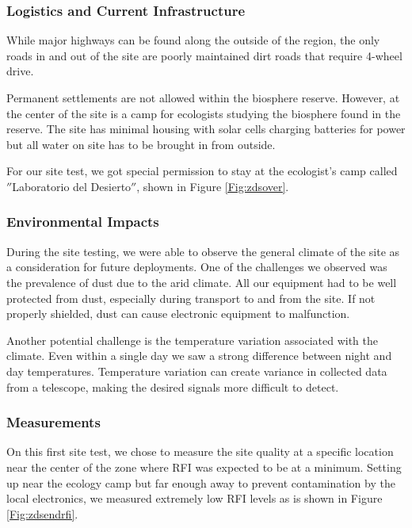 \subsubsection{Logistics and Current Infrastructure}

While major highways can be found along the outside of the region, the only roads in and out of the site are poorly maintained dirt roads that require 4-wheel drive.

Permanent settlements are not allowed within the biosphere reserve. However, at the center of the site is a camp for ecologists studying the biosphere found in the reserve. The site has minimal housing with solar cells charging batteries for power but all water on site has to be brought in from outside. 

For our site test, we got special permission to stay at the ecologist's camp called $''$Laboratorio del Desierto$''$, shown in Figure \ref{Fig:zdsover}.

\subsubsection{Environmental Impacts}

During the site testing, we were able to observe the general climate of the site as a consideration for future deployments. One of the challenges we observed was the prevalence of dust due to the arid climate. All our equipment had to be well protected from dust, especially during transport to and from the site. If not properly shielded, dust can cause electronic equipment to malfunction. 

Another potential challenge is the temperature variation associated with the climate. Even within a single day we saw a strong difference between night and day temperatures. Temperature variation can create variance in collected data from a telescope, making the desired signals more difficult to detect. 

\subsubsection{Measurements}

On this first site test, we chose to measure the site quality at a specific location near the center of the zone where RFI was expected to be at a minimum. Setting up near the ecology camp but far enough away to prevent contamination by the local electronics, we measured extremely low RFI levels as is shown in Figure \ref{Fig:zdsendrfi}.

